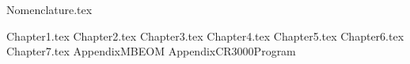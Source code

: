 \documentclass[12pt,american]{report}
\begin{document}

\renewcommand\thepage{}

\newpage
\mbox{}
\newpage

\renewcommand\thepage{\arabic{page}}
\setcounter{page}{2}


\doublespacing               %

           


\singlespacing
\tableofcontents             %
\listoftables                %
\listoffigures               %
{Nomenclature.tex}
\cleardoublepage             %

\doublespacing
{Chapter1.tex}
{Chapter2.tex}
{Chapter3.tex}
{Chapter4.tex}
{Chapter5.tex}
{Chapter6.tex}
{Chapter7.tex}
{AppendixMBEOM}
{AppendixCR3000Program}

\singlespacing
{}  %
\end{document}
